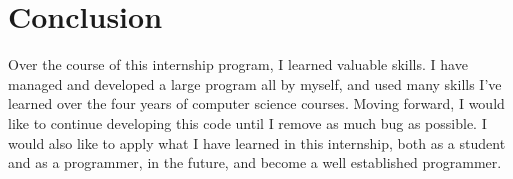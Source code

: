 \section{Conclusion}

Over the course of this internship program, I learned valuable skills.  I have managed and developed a large program all by myself, and used many skills I've learned over the four years of computer science courses.  Moving forward, I would like to continue developing this code until I remove as much bug as possible.  I would also like to apply what I have learned in this internship, both as a student and as a programmer, in the future, and become a well established programmer.
